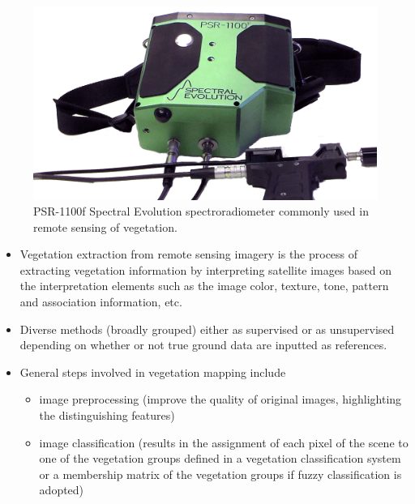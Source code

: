 \documentclass[11pt,dvipsnames,ignorenonframetext,aspectratio=169]{beamer}
\providecommand{\tightlist}{%
  \setlength{\itemsep}{0pt}\setlength{\parskip}{0pt}}
\begin{document}
\begin{frame}{}
\protect\hypertarget{section-5}{}
\begin{figure}
\includegraphics[width=0.45\linewidth]{../images/spectral_evolution_portable_spectroradiometer} \caption{PSR-1100f Spectral Evolution spectroradiometer commonly used in remote sensing of vegetation.}\label{fig:spectroradiometer}
\end{figure}
\end{frame}

\begin{frame}{}
\protect\hypertarget{section-6}{}
\begin{itemize}
\tightlist
\item
  Vegetation extraction from remote sensing imagery is the process of
  extracting vegetation information by interpreting satellite images
  based on the interpretation elements such as the image color, texture,
  tone, pattern and association information, etc.
\item
  Diverse methods (broadly grouped) either as supervised or as
  unsupervised depending on whether or not true ground data are inputted
  as references.
\item
  General steps involved in vegetation mapping include

  \begin{itemize}
  \tightlist
  \item
    image preprocessing (improve the quality of original images,
    highlighting the distinguishing features)
  \item
    image classification (results in the assignment of each pixel of the
    scene to one of the vegetation groups defined in a vegetation
    classification system or a membership matrix of the vegetation
    groups if fuzzy classification is adopted)
  \end{itemize}
\end{itemize}
\end{frame}
\end{document}
